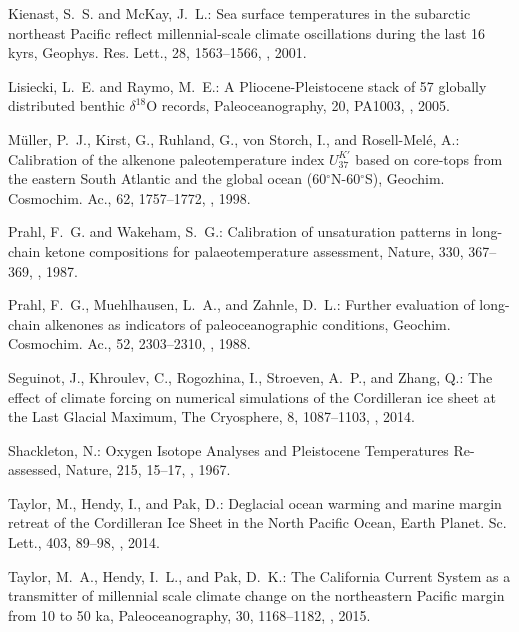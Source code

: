 \begin{thebibliography}{69}
Kienast, S.~S. and McKay, J.~L.: Sea surface temperatures in the subarctic
  northeast Pacific reflect millennial-scale climate oscillations during the
  last 16 kyrs, Geophys. Res. Lett., 28, 1563--1566,
  , 2001.

Lisiecki, L.~E. and Raymo, M.~E.: A Pliocene-Pleistocene stack of 57 globally
  distributed benthic $\delta^{18}$O records, Paleoceanography, 20, PA1003,
  , 2005.

M\"{u}ller, P.~J., Kirst, G., Ruhland, G., von Storch, I., and
  Rosell-Mel{\'{e}}, A.: Calibration of the alkenone paleotemperature index
  $U^{K'}_{37}$ based on core-tops from the eastern South Atlantic and the
  global ocean (60$^\circ$N-60$^\circ$S), Geochim. Cosmochim. Ac., 62,
  1757--1772, , 1998.

Prahl, F.~G. and Wakeham, S.~G.: Calibration of unsaturation patterns in
  long-chain ketone compositions for palaeotemperature assessment, Nature, 330,
  367--369, , 1987.

Prahl, F.~G., Muehlhausen, L.~A., and Zahnle, D.~L.: Further evaluation of
  long-chain alkenones as indicators of paleoceanographic conditions, Geochim.
  Cosmochim. Ac., 52, 2303--2310, , 1988.

Seguinot, J., Khroulev, C., Rogozhina, I., Stroeven, A.~P., and Zhang, Q.: The
  effect of climate forcing on numerical simulations of the {C}ordilleran ice
  sheet at the {L}ast {G}lacial {M}aximum, The Cryosphere, 8, 1087--1103,
  , 2014.

Shackleton, N.: Oxygen Isotope Analyses and Pleistocene Temperatures
  Re-assessed, Nature, 215, 15--17, , 1967.

Taylor, M., Hendy, I., and Pak, D.: Deglacial ocean warming and marine margin
  retreat of the Cordilleran Ice Sheet in the North Pacific Ocean, Earth
  Planet. Sc. Lett., 403, 89--98, , 2014.

Taylor, M.~A., Hendy, I.~L., and Pak, D.~K.: The California Current System as a
  transmitter of millennial scale climate change on the northeastern Pacific
  margin from 10 to 50 ka, Paleoceanography, 30, 1168--1182,
  , 2015.

\end{thebibliography}



